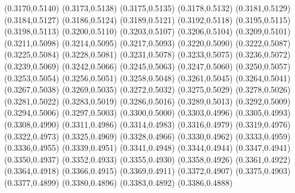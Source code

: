\PST@Filltriangle(0.3170,0.5140)
\PST@Filltriangle(0.3173,0.5138)
\PST@Filltriangle(0.3175,0.5135)
\PST@Filltriangle(0.3178,0.5132)
\PST@Filltriangle(0.3181,0.5129)
\PST@Filltriangle(0.3184,0.5127)
\PST@Filltriangle(0.3186,0.5124)
\PST@Filltriangle(0.3189,0.5121)
\PST@Filltriangle(0.3192,0.5118)
\PST@Filltriangle(0.3195,0.5115)
\PST@Filltriangle(0.3198,0.5113)
\PST@Filltriangle(0.3200,0.5110)
\PST@Filltriangle(0.3203,0.5107)
\PST@Filltriangle(0.3206,0.5104)
\PST@Filltriangle(0.3209,0.5101)
\PST@Filltriangle(0.3211,0.5098)
\PST@Filltriangle(0.3214,0.5095)
\PST@Filltriangle(0.3217,0.5093)
\PST@Filltriangle(0.3220,0.5090)
\PST@Filltriangle(0.3222,0.5087)
\PST@Filltriangle(0.3225,0.5084)
\PST@Filltriangle(0.3228,0.5081)
\PST@Filltriangle(0.3231,0.5078)
\PST@Filltriangle(0.3233,0.5075)
\PST@Filltriangle(0.3236,0.5072)
\PST@Filltriangle(0.3239,0.5069)
\PST@Filltriangle(0.3242,0.5066)
\PST@Filltriangle(0.3245,0.5063)
\PST@Filltriangle(0.3247,0.5060)
\PST@Filltriangle(0.3250,0.5057)
\PST@Filltriangle(0.3253,0.5054)
\PST@Filltriangle(0.3256,0.5051)
\PST@Filltriangle(0.3258,0.5048)
\PST@Filltriangle(0.3261,0.5045)
\PST@Filltriangle(0.3264,0.5041)
\PST@Filltriangle(0.3267,0.5038)
\PST@Filltriangle(0.3269,0.5035)
\PST@Filltriangle(0.3272,0.5032)
\PST@Filltriangle(0.3275,0.5029)
\PST@Filltriangle(0.3278,0.5026)
\PST@Filltriangle(0.3281,0.5022)
\PST@Filltriangle(0.3283,0.5019)
\PST@Filltriangle(0.3286,0.5016)
\PST@Filltriangle(0.3289,0.5013)
\PST@Filltriangle(0.3292,0.5009)
\PST@Filltriangle(0.3294,0.5006)
\PST@Filltriangle(0.3297,0.5003)
\PST@Filltriangle(0.3300,0.5000)
\PST@Filltriangle(0.3303,0.4996)
\PST@Filltriangle(0.3305,0.4993)
\PST@Filltriangle(0.3308,0.4990)
\PST@Filltriangle(0.3311,0.4986)
\PST@Filltriangle(0.3314,0.4983)
\PST@Filltriangle(0.3316,0.4979)
\PST@Filltriangle(0.3319,0.4976)
\PST@Filltriangle(0.3322,0.4973)
\PST@Filltriangle(0.3325,0.4969)
\PST@Filltriangle(0.3328,0.4966)
\PST@Filltriangle(0.3330,0.4962)
\PST@Filltriangle(0.3333,0.4959)
\PST@Filltriangle(0.3336,0.4955)
\PST@Filltriangle(0.3339,0.4951)
\PST@Filltriangle(0.3341,0.4948)
\PST@Filltriangle(0.3344,0.4944)
\PST@Filltriangle(0.3347,0.4941)
\PST@Filltriangle(0.3350,0.4937)
\PST@Filltriangle(0.3352,0.4933)
\PST@Filltriangle(0.3355,0.4930)
\PST@Filltriangle(0.3358,0.4926)
\PST@Filltriangle(0.3361,0.4922)
\PST@Filltriangle(0.3364,0.4918)
\PST@Filltriangle(0.3366,0.4915)
\PST@Filltriangle(0.3369,0.4911)
\PST@Filltriangle(0.3372,0.4907)
\PST@Filltriangle(0.3375,0.4903)
\PST@Filltriangle(0.3377,0.4899)
\PST@Filltriangle(0.3380,0.4896)
\PST@Filltriangle(0.3383,0.4892)
\PST@Filltriangle(0.3386,0.4888)
